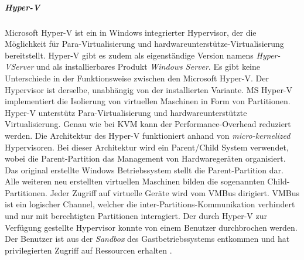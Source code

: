 \subparagraph{Hyper-V}
Microsoft Hyper-V ist ein in Windows integrierter Hypervisor, der die Möglichkeit für Para-Virtualisierung und hardwareunterstütze-Virtualisierung bereitstellt. Hyper-V gibt es zudem als eigenständige Version namens \emph{Hyper-VServer} und als installierbares Produkt \emph{Windows Server}. Es gibt keine Unterschiede in der Funktionsweise zwischen den Microsoft Hyper-V. Der Hypervisor ist derselbe, unabhängig von der installierten Variante. MS Hyper-V implementiert die Isolierung von virtuellen Maschinen in Form von Partitionen. Hyper-V unterstütz Para-Virtualisierung und hardwareunterstützte Virtualisierung. Genau wie bei KVM kann der Performance-Overhead reduziert werden. Die Architektur des Hyper-V funktioniert anhand von \emph{micro-kernelized} Hypervisoren. Bei dieser Architektur wird ein Parent/Child System verwendet, wobei die Parent-Partition das Management von Hardwaregeräten organisiert. Das original erstellte Windows Betriebssystem stellt die Parent-Partition dar. Alle weiteren neu erstellten virtuellen Maschinen bilden die sogenannten Child-Partitionen. Jeder Zugriff auf virtuelle Geräte wird vom VMBus dirigiert. VMBus ist ein logischer Channel, welcher die inter-Partitions-Kommunikation verhindert und nur mit berechtigten Partitionen interagiert. Der durch Hyper-V zur Verfügung gestellte Hypervisor konnte von einem Benutzer durchbrochen werden. Der Benutzer ist aus der \emph{Sandbox} des Gastbetriebssystems entkommen und hat privilegierten Zugriff auf Ressourcen erhalten \cite{Fayyad-Kazan2013BenchmarkingHypervisors}.
